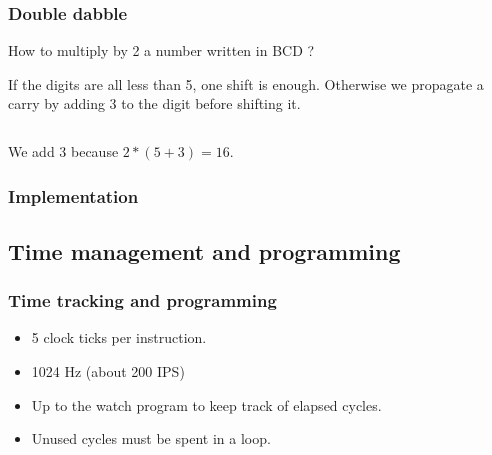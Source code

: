 \documentclass{beamer}
\begin{document}
\begin{frame}
    \frametitle{Double dabble}

    How to multiply by 2 a number written in BCD ?
    \pause

    If the digits are all less than 5, one shift is enough.
    Otherwise we propagate a carry by adding 3 to the digit before shifting it.
    \pause

    \begin{columns}[t]
        \begin{column}[T]{5cm}
            \vspace{1cm}
        \end{column}
        \begin{column}[T]{5cm}
            \vspace{1cm}

        \end{column}
    \end{columns}

    We add 3 because $2*(5 + 3) = 16$.
\end{frame}

\begin{frame}
  \frametitle{Implementation}

  

\end{frame}

\subsection{Time management and programming}
\begin{frame}
  \frametitle{Time tracking and programming}
  \begin{itemize}
    \item 5 clock ticks per instruction.
    \item 1024 Hz (about 200 IPS)
    \item<2-> Up to the watch program to keep track of elapsed cycles.
    \item<3-> Unused cycles must be spent in a loop.
  \end{itemize}
\end{frame}
\end{document}
